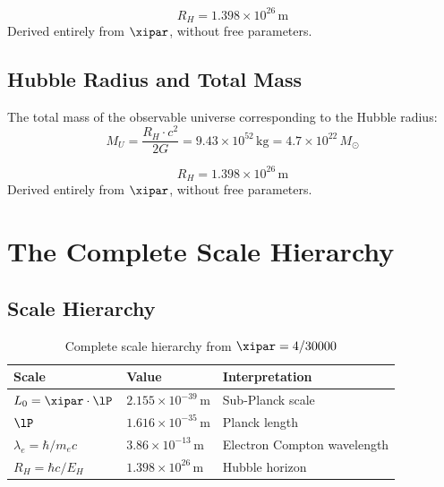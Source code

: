 \begin{keyresult}
\begin{equation}
	\boxed{R_H = 1{.}398 \times 10^{26}\,\text{m}}
\end{equation}
Derived entirely from $\xipar$, without free parameters.
\end{keyresult}

\subsection{Hubble Radius and Total Mass}

The total mass of the observable universe corresponding to the Hubble radius:
\begin{equation}
	M_U = \frac{R_H \cdot c^2}{2G} = 9{.}43 \times 10^{52}\,\text{kg} = 4{.}7 \times 10^{22}\,M_\odot
\end{equation}

\begin{keyresult}
\begin{equation}
	\boxed{R_H = 1{.}398 \times 10^{26}\,\text{m}}
\end{equation}
Derived entirely from $\xipar$, without free parameters.
\end{keyresult}

\section{The Complete Scale Hierarchy}

\subsection{Scale Hierarchy}

\begin{table}[h]
\centering
\begin{tabular}{lll}
\toprule
\textbf{Scale} & \textbf{Value} & \textbf{Interpretation} \\
\midrule
$L_0 = \xipar \cdot \lP$ & $2{.}155 \times 10^{-39}\,\text{m}$ & Sub-Planck scale \\
$\lP$ & $1{.}616 \times 10^{-35}\,\text{m}$ & Planck length \\
$\lambda_e = \hbar/m_e c$ & $3{.}86 \times 10^{-13}\,\text{m}$ & Electron Compton wavelength \\
$R_H = \hbar c / E_H$ & $1{.}398 \times 10^{26}\,\text{m}$ & Hubble horizon \\
\bottomrule
\end{tabular}
\caption{Complete scale hierarchy from $\xipar = 4/30000$}
\end{table}

